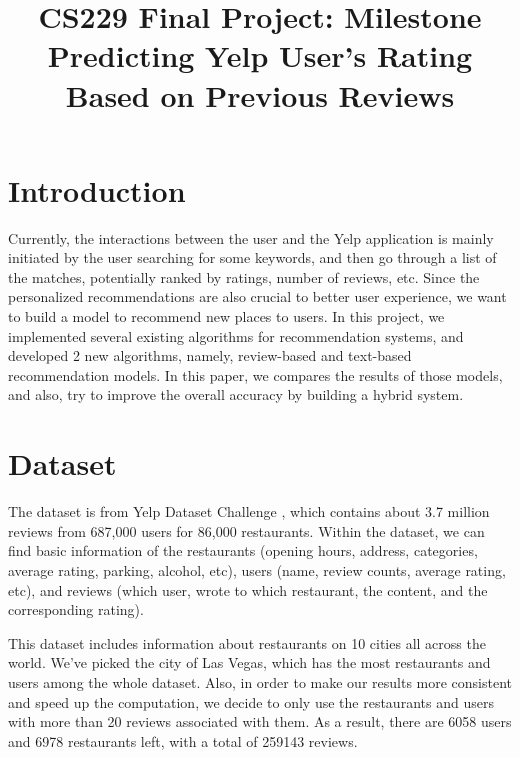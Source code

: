 \documentclass[conference]{IEEEtran}
\begin{document}
\title{{\huge CS229 Final Project: Milestone \\
Predicting Yelp User's Rating Based on Previous Reviews}}

\author{
\and
{}
} 

\maketitle

\section{Introduction}
Currently, the interactions between the user and the Yelp application is mainly initiated by the user searching for some keywords, and then go through a list of the matches, potentially ranked by ratings, number of reviews, etc. 
Since the personalized recommendations are also crucial to better user experience, we want to build a model to recommend new places to users. In this project, 
we implemented several existing algorithms for recommendation systems, and 
developed 2 new algorithms, namely, review-based and text-based recommendation
models. In this paper, we compares the results of those models, and also, 
try to improve the overall accuracy by building a hybrid system.
\par

\section{Dataset}
The dataset is from Yelp Dataset Challenge \cite{yelp_url}, which contains about 3.7 million reviews from 687,000 users for 86,000 restaurants. Within the dataset, we can find basic information of the restaurants (opening hours, address, categories, average rating, parking, alcohol, etc), users (name, review counts, average rating, etc), and reviews (which user, wrote to which restaurant, the content, and the corresponding rating). 
\par
This dataset includes information about restaurants on 10 cities all across 
the world. We've picked the city of Las Vegas, which has the most restaurants 
and users among the whole dataset. Also, in order to make our results more consistent and speed up the computation, we decide to only use
the restaurants and users with more than 20 reviews associated with them. As a result, there are 6058 users and 6978 restaurants left, with a total of 259143 reviews.
\end{document}
